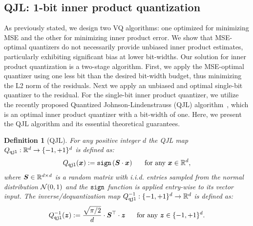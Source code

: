 \documentclass[11pt]{article}
\newtheorem{definition}{Definition}
\begin{document}

\subsection{QJL: 1-bit inner product quantization}
As previously stated, we design two VQ algorithms: one optimized for minimizing MSE and the other for minimizing inner product error. 
We show that MSE-optimal quantizers do not necessarily provide unbiased inner product estimates, particularly exhibiting significant bias at lower bit-widths.
Our solution for inner product quantization is a two-stage algorithm. 
First, we apply the MSE-optimal quantizer using one less bit than the desired bit-width budget, thus minimizing the L2 norm of the residuals.
Next we apply an unbiased and optimal single-bit quantizer to the residual.
For the single-bit inner product quantizer, we utilize the recently proposed Quantized Johnson-Lindenstrauss (QJL) algorithm~\cite{qjl}, which is an optimal inner product quantizer with a bit-width of one. Here, we present the QJL algorithm and its essential theoretical guarantees.
\begin{definition}[QJL]\label{def_qjl}
For any positive integer $d$ the QJL map $Q_{\tt qjl}: \mathbb{R}^d \to \{ -1, +1 \}^d$ is defined as:
\[
Q_{\tt qjl}({\bm x}) := {\tt sign} \left( {\bm S} \cdot {\bm x} \right) ~~~~\text{ for any } {\bm x} \in \mathbb{R}^d,
\]
where ${\bm S} \in \mathbb{R}^{d \times d}$ is a random matrix with i.i.d. entries sampled from the normal distribution $\mathcal{N}(0, 1)$ and the ${\tt sign}$ function is applied entry-wise to its vector input.
The inverse/dequantization map $Q_{\tt qjl}^{-1}: \{ -1, +1\}^d \to \mathbb{R}^d$ is defined as:
\[
Q_{\tt qjl}^{-1}({\bm z}) := \frac{\sqrt{\pi/2}}{d} \cdot {\bm S}^\top \cdot {\bm z} ~~~~\text{ for any } {\bm z} \in \{ -1, +1\}^d.
\]
\end{definition}
\end{document}
